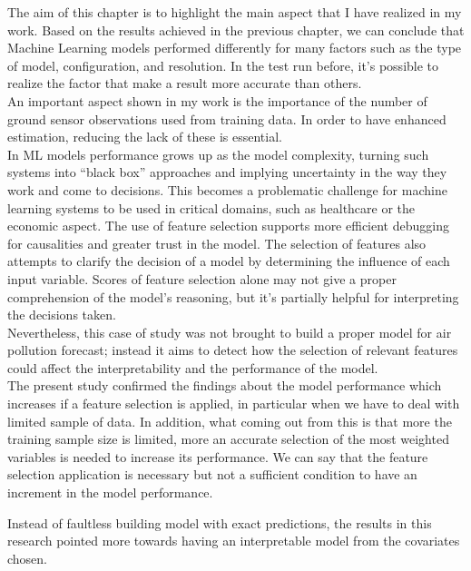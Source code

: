 The aim of this chapter is to highlight the main aspect that I have realized in my work.
Based on the results achieved in the previous chapter, we can conclude that Machine Learning models performed differently for many factors such as the type of model, configuration, and resolution.
In the test run before, it's possible to realize the factor that make a result more accurate than others.\\
An important aspect shown in my work is the importance of the number of ground sensor observations used from training data. In order to have enhanced estimation, reducing the lack of these is essential.\\
In ML models performance grows up as the model complexity, turning such systems into “black box” approaches and implying uncertainty in the way they work and come to decisions. 
This becomes a problematic challenge for machine learning systems to be used in critical domains, such as healthcare or the economic aspect.
The use of feature selection supports more efficient debugging for causalities and greater trust in the model.
The selection of features also attempts to clarify the decision of a model by determining the influence of each input variable. 
Scores of feature selection alone may not give a proper comprehension of the model’s reasoning, but it's partially helpful for interpreting the decisions taken.\\
Nevertheless, this case of study was not brought to build a proper model for air pollution forecast; instead it aims to detect how the selection of relevant features could affect the interpretability and the performance of the model. \\
The present study confirmed the findings about the model performance which increases if a feature selection is applied, in particular when we have to deal with limited sample of data\cite{vabalas2019machine}. 
In addition, what coming out from this is that more the training sample size is limited, more an accurate selection of the most weighted variables is needed to increase its performance.
We can say that the feature selection application is necessary but not a sufficient condition to have an increment in the model performance.
\begin{comment}
In this work, so it is highlighted the effect of how the training in ML should benefit from an accurate selection of variable. 
\end{comment}
Instead of faultless building model with exact predictions, the results in this research pointed more towards having an interpretable model from the covariates chosen. 
